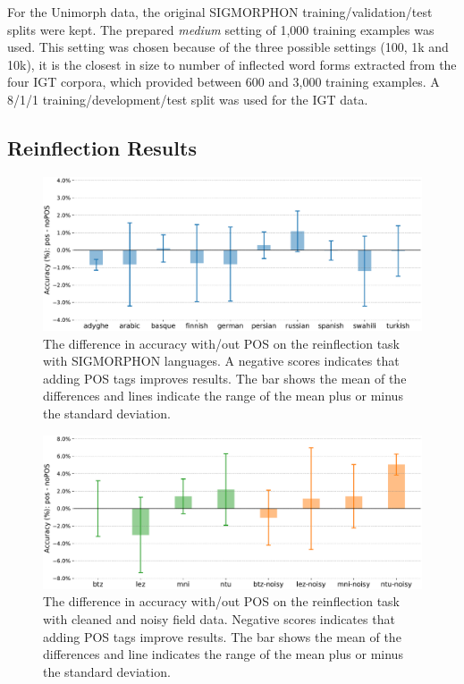 For the Unimorph data, the original SIGMORPHON training/validation/test splits were kept. The prepared \textit{medium} setting of 1,000 training examples was used. This setting was chosen because of the three possible settings (100, 1k and 10k), it is the closest in size to number of inflected word forms extracted from the four IGT corpora, which provided between 600 and 3,000 training examples. A 8/1/1 training/development/test split was used for the IGT data.


\subsection{Reinflection Results}
\label{sec:inflectionresults}

\begin{figure}[!tb]
    \centering
    \includegraphics[width=34em]{figs/pos_2018data.pdf}
    \caption[SIGMORPHON Reinflection with/out POS Tags]{The difference in accuracy with/out POS on the reinflection task with SIGMORPHON languages. A negative scores indicates that adding POS tags improves results. The bar shows the mean of the differences and lines indicate the range of the mean plus or minus the standard deviation.}
    \label{fig:sigreinfl}
\end{figure}

\begin{figure}[!tb]
    \centering
    \includegraphics[width=41em]{figs/pos_igtdata.pdf}
    \caption[IGT Reinflection with/out POS Tags]{The difference in accuracy with/out POS on the reinflection task with cleaned and noisy field data. Negative scores indicates that adding POS tags improve results. The bar shows the mean of the differences and line indicates the range of the mean plus or minus the standard deviation.}
    \label{fig:igtreinfl}
\end{figure}


